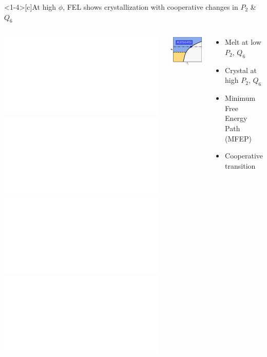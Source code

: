 \documentclass[aspectratio=169]{beamer}
\begin{document}

\begin{frame}<1-4>[c]{At high $\phi$, FEL shows crystallization with cooperative changes in $P_{2}$ \& $Q_{6}$}

  \begin{columns}[T]

    \centering
    \includegraphics<1>[]{../figures/fig-pathway_10p25/subfig-pathway_10p25.pdf}\includegraphics<2>[]{../figures/fig-pathway_10p25/fig-pathway_10p25_wConfs.pdf}\includegraphics<3>[]{../figures/fig-pathway_10p25/fig-pathway_10p25_wMFEP.pdf}\includegraphics<4>[]{../figures/fig-pathway_10p25/fig-pathway_10p25_wArrow.pdf}

     \centering
     \includegraphics[]{../figures/old_fig-pathway_10p25/fig-phase_diag_mark_cryst.pdf}
     \vspace{-0.5\baselineskip}
     \begin{block}{}
       \begin{itemize}
         \setlength\itemsep{0.5em}
         \item Melt at low $P_{2}$, $Q_{6}$
         \item Crystal at high $P_{2}$, $Q_{6}$
         \item<3-> {\color{yellow}{\rule{1cm}{0.1cm}} } Minimum Free Energy Path (MFEP)
         \item<4>{Cooperative transition}
       \end{itemize}
     \end{block}

  \end{columns}

  \leavevmode\par

\end{frame}
\end{document}
